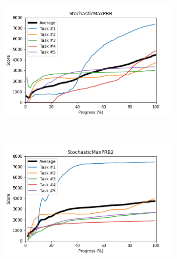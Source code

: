 \documentclass{article} %
\begin{document}
\begin{figure}[!ht]
   \begin{subfigure}[t]{0.5\textwidth}
        \centering
        \includegraphics[width=\textwidth]{images/StochasticMaxPRB.png}
    \end{subfigure}%
	~     
    \begin{subfigure}[t]{0.5\textwidth}
        \centering
        \includegraphics[width=\textwidth]{images/StochasticMaxPRB2.png}
    \end{subfigure}%
    

\end{figure}
\end{document}
